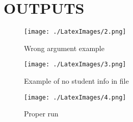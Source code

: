 \documentclass{article}
\begin{document}
\newpage
\section{OUTPUTS}

\begin{figure}[htp]
    \centering
    \texttt{[image: ./LatexImages/2.png]}
    \caption{Wrong argument example}
    \label{fig:galaxy}
\end{figure}
\begin{figure}[htp]
    \centering
    \texttt{[image: ./LatexImages/3.png]}
    \caption{Example of no student info in file}
    \label{fig:galaxy}
\end{figure}
\begin{figure}[htp]
    \centering
    \texttt{[image: ./LatexImages/4.png]}
    \caption{Proper run}
    \label{fig:galaxy}
\end{figure}
\end{document}
